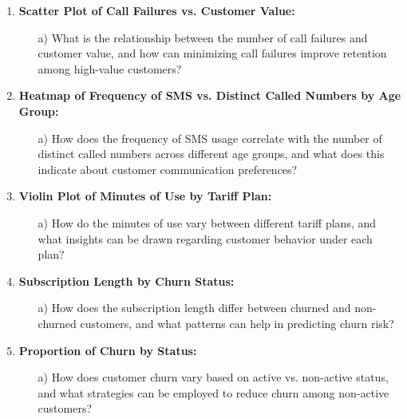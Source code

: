 \documentclass[12pt]{article}
\begin{document}
\begin{enumerate}
    \item \textbf{Scatter Plot of Call Failures vs. Customer Value:}
    
    \begin{enumerate}
        \item[a)] What is the relationship between the number of call failures and customer value, and how can minimizing call failures improve retention among high-value customers?
    \end{enumerate}

    \item \textbf{Heatmap of Frequency of SMS vs. Distinct Called Numbers by Age Group:}
    
    \begin{enumerate}
        \item[a)] How does the frequency of SMS usage correlate with the number of distinct called numbers across different age groups, and what does this indicate about customer communication preferences?
    \end{enumerate}

    \item \textbf{Violin Plot of Minutes of Use by Tariff Plan:}
    
    \begin{enumerate}
        \item[a)] How do the minutes of use vary between different tariff plans, and what insights can be drawn regarding customer behavior under each plan?
    \end{enumerate}

    \item \textbf{Subscription Length by Churn Status:}
    
    \begin{enumerate}
        \item[a)] How does the subscription length differ between churned and non-churned customers, and what patterns can help in predicting churn risk?
    \end{enumerate}

    \item \textbf{Proportion of Churn by Status:}
    
    \begin{enumerate}
        \item[a)] How does customer churn vary based on active vs. non-active status, and what strategies can be employed to reduce churn among non-active customers?
    \end{enumerate}


\end{enumerate}
\end{document}
